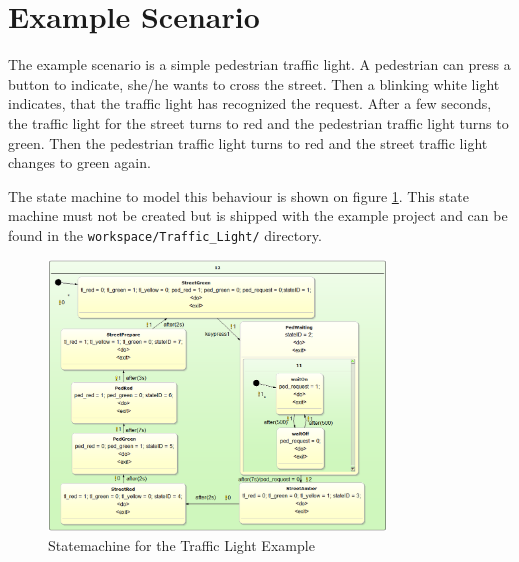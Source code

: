 %
\section{Example Scenario}

The example scenario is a simple pedestrian traffic light. A pedestrian can press
a button to indicate, she/he wants to cross the street. Then a blinking white
light indicates, that the traffic light has recognized the request. After a few
seconds, the traffic light for the street turns to red and the pedestrian traffic
light turns to green. Then the pedestrian traffic light turns to red and the
street traffic light changes to green again.
    
The state machine to model this behaviour is shown on figure
\ref{fig:statemachine}. This state machine must not be created but is shipped
with the example project and can be found in the
\texttt{workspace/Traffic\_Light/} directory.
    
\begin{figure}[ht] \center
\includegraphics[width=0.8\textwidth]{./Pictures/Statemachine}
\caption{\label{fig:statemachine}Statemachine for the Traffic Light Example}
\end{figure}

